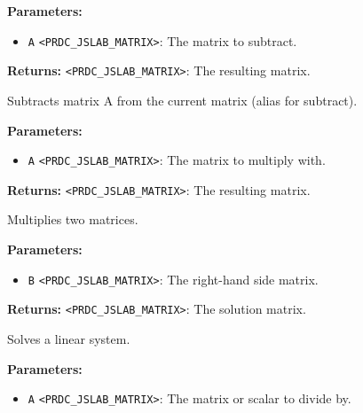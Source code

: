 \documentclass[12pt,a4paper]{article}
\begin{document}
\noindent \textbf{Parameters:}
\begin{itemize}
  \item \texttt{A} \texttt{<PRDC\_JSLAB\_MATRIX>}: The matrix to subtract.
\end{itemize}

\noindent \textbf{Returns:} \texttt{<PRDC\_JSLAB\_MATRIX>}: The resulting matrix.

\noindent Subtracts matrix A from the current matrix (alias for subtract).

\vspace{5mm}
\noindent {}


\noindent \textbf{Parameters:}
\begin{itemize}
  \item \texttt{A} \texttt{<PRDC\_JSLAB\_MATRIX>}: The matrix to multiply with.
\end{itemize}

\noindent \textbf{Returns:} \texttt{<PRDC\_JSLAB\_MATRIX>}: The resulting matrix.

\noindent Multiplies two matrices.

\vspace{5mm}
\noindent {}


\noindent \textbf{Parameters:}
\begin{itemize}
  \item \texttt{B} \texttt{<PRDC\_JSLAB\_MATRIX>}: The right-hand side matrix.
\end{itemize}

\noindent \textbf{Returns:} \texttt{<PRDC\_JSLAB\_MATRIX>}: The solution matrix.

\noindent Solves a linear system.

\vspace{5mm}
\noindent {}


\noindent \textbf{Parameters:}
\begin{itemize}
  \item \texttt{A} \texttt{<PRDC\_JSLAB\_MATRIX>}: The matrix or scalar to divide by.
\end{itemize}
\end{document}
